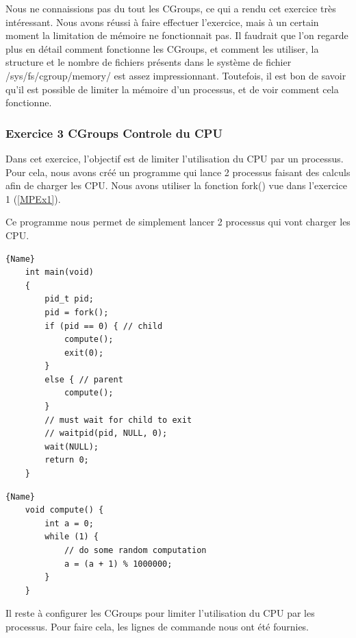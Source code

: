 \documentclass[
	a4paper, %
	10pt, %
]{CSUniSchoolLabReport}
\begin{document}

Nous ne connaissions pas du tout les CGroups, ce qui a rendu cet exercice tr\`es int\'eressant.
Nous avons réussi \`a faire effectuer l'exercice, mais \`a un certain moment la limitation de m\'emoire ne fonctionnait pas.
Il faudrait que l'on regarde plus en d\'etail comment fonctionne les CGroups, et comment les utiliser, la structure et le nombre de fichiers pr\'esents dans le syst\`eme de fichier /sys/fs/cgroup/memory/ est assez impressionnant.
Toutefois, il est bon de savoir qu'il est possible de limiter la m\'emoire d'un processus, et de voir comment cela fonctionne.

\subsubsection{Exercice 3 CGroups Controle du CPU}\label{MPEx3}
Dans cet exercice, l'objectif est de limiter l'utilisation du CPU par un processus.
Pour cela, nous avons cré\'e un programme qui lance 2 processus faisant des calculs afin de charger les CPU. 
Nous avons utiliser la fonction fork() vue dans l'exercice 1 (\ref{MPEx1}).

Ce programme nous permet de simplement lancer 2 processus qui vont charger les CPU.\\
\noindent\begin{minipage}{.50\textwidth}
	\begin{lstlisting}[style=CStyle, caption=Processus Enfant, firstnumber=1]{Name}
	int main(void)
	{
		pid_t pid;
		pid = fork();
		if (pid == 0) { // child
			compute();
			exit(0);
		}
		else { // parent
			compute();
		}
		// must wait for child to exit
		// waitpid(pid, NULL, 0);
		wait(NULL);
		return 0;
	}
	\end{lstlisting}
	\end{minipage}\hfill
	\begin{minipage}{.45\textwidth}
	\begin{lstlisting}[style=CStyle, caption=Processus Parent, firstnumber=1]{Name}
	void compute() {
		int a = 0;
		while (1) {
			// do some random computation
			a = (a + 1) % 1000000;
		}
	}
	\end{lstlisting}
\end{minipage}

Il reste \`a configurer les CGroups pour limiter l'utilisation du CPU par les processus. Pour faire cela, les lignes de commande nous ont été fournies.
\end{document}
